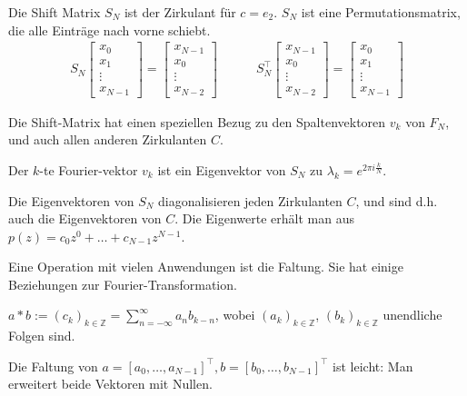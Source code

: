 Die Shift Matrix $S_N$ ist der Zirkulant für $c=e_2$. $S_N$ ist eine Permutationsmatrix, die alle Einträge nach vorne schiebt.
\begin{align*}
    S_N \begin{bmatrix}
        x_0 \\
        x_1 \\
        \vdots \\
        x_{N-1}
    \end{bmatrix}
    =
    \begin{bmatrix}
        x_{N-1} \\
        x_0 \\
        \vdots \\
        x_{N-2}
    \end{bmatrix}
    \quad \quad \quad 
    S_N^\top \begin{bmatrix}
        x_{N-1} \\
        x_0 \\
        \vdots \\
        x_{N-2}
    \end{bmatrix}
    =
    \begin{bmatrix}
        x_0 \\
        x_1 \\
        \vdots \\
        x_{N-1}
    \end{bmatrix}
\end{align*}

Die Shift-Matrix hat einen speziellen Bezug zu den Spaltenvektoren $v_k$ von $F_N$, und auch allen anderen Zirkulanten $C$.

\inlineremark Der $k$-te Fourier-vektor $v_k$ ist ein Eigenvektor von $S_N$ zu $\lambda_k = e^{2\pi i \frac{k}{N}}$.

 Die Eigenvektoren von $S_N$ diagonalisieren jeden Zirkulanten $C$, und sind d.h. auch die Eigenvektoren von $C$.
Die Eigenwerte erhält man aus $p(z) = c_0z^0 + \ldots + c_{N-1}z^{N-1}$.

Eine Operation mit vielen Anwendungen ist die Faltung. Sie hat einige Beziehungen zur Fourier-Transformation.

 $a * b := (c_k)_{k \in \mathbb{Z}} = \displaystyle\sum_{n=-\infty}^{\infty}a_nb_{k-n}$, wobei $(a_k)_{k \in \mathbb{Z}}$, $(b_k)_{k \in \mathbb{Z}}$ unendliche Folgen sind.

Die Faltung von $a = [a_0,\ldots,a_{N-1}]^\top, b = [b_0,\ldots,b_{N-1}]^\top$ ist leicht: Man erweitert beide Vektoren mit Nullen.

